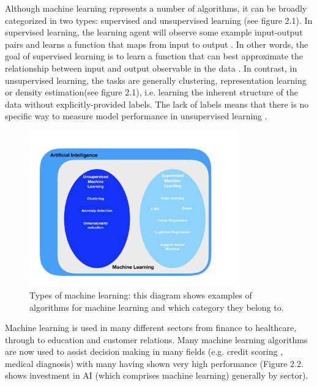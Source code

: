 Although machine learning represents a number of algorithms, it can be broadly categorized in two types: supervised and unsupervised learning (see figure 2.1). In supervised learning, the learning agent will observe some example input-output pairs and learns a function that maps from input to output \citep{Russell:2016tz}. In other words, the goal of supervised learning is to learn a function that can best approximate the relationship between input and output observable in the data \citep{Mullainathan:uy}.\newline 
In contrast, in unsupervised learning, the tasks are generally clustering, representation learning or density estimation(see figure 2.1), i.e. learning the inherent structure of the data without explicitly-provided labels. The lack of labels means that there is no specific way to measure model performance in unsupervised learning \citep{Soni:tr}.

\begin{figure}[H]
\centering
\includegraphics[width=0.8\textwidth]{ThesisTemplate/usingLatex/images/Figure1.png}
\caption{Types of machine learning: this diagram shows examples of algorithms for machine learning and which category they belong to.}
 \label{fig:machineLearning}
\end{figure}


Machine learning is used in many different sectors from finance to healthcare, through to education and customer relations. Many machine learning algorithms are now used to assist decision making in many fields (e.g. credit scoring \citep{Guegan:2018ey}, medical diagnosis) with many having shown very high performance (Figure 2.2. shows investment in AI (which comprises machine learning) generally by sector).

